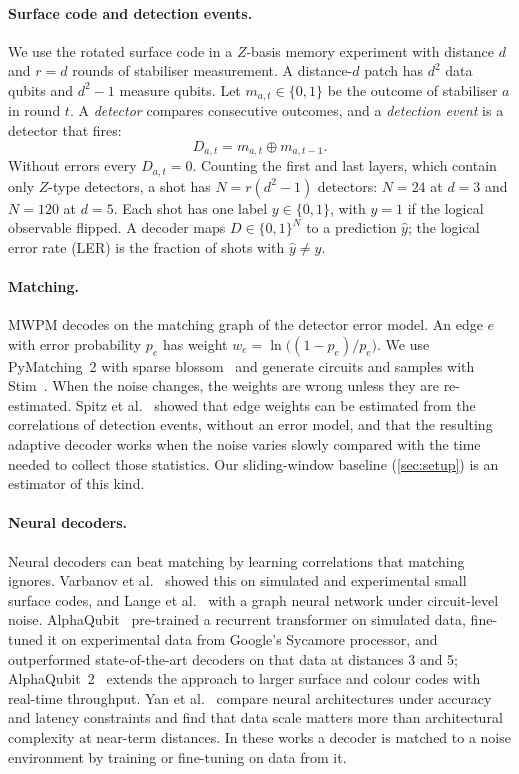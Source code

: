 \documentclass[11pt,a4paper]{article}
\begin{document}
\paragraph{Surface code and detection events.}
We use the rotated surface code in a $Z$-basis memory experiment with distance $d$ and $r=d$ rounds of
stabiliser measurement. A distance-$d$ patch has $d^2$ data qubits and $d^2-1$ measure qubits. Let
$m_{a,t}\in\{0,1\}$ be the outcome of stabiliser $a$ in round $t$. A \emph{detector} compares consecutive
outcomes, and a \emph{detection event} is a detector that fires:
\begin{equation}
  D_{a,t} = m_{a,t}\oplus m_{a,t-1}.
\end{equation}
Without errors every $D_{a,t}=0$. Counting the first and last layers, which contain only $Z$-type detectors, a
shot has $N=r(d^2-1)$ detectors: $N=24$ at $d=3$ and $N=120$ at $d=5$. Each shot has one label
$y\in\{0,1\}$, with $y=1$ if the logical observable flipped. A decoder maps $D\in\{0,1\}^N$ to a prediction
$\hat y$; the logical error rate (LER) is the fraction of shots with $\hat y\neq y$.

\paragraph{Matching.}
MWPM decodes on the matching graph of the detector error model. An edge $e$ with error probability $p_e$ has
weight $w_e=\ln\bigl((1-p_e)/p_e\bigr)$. We use PyMatching~2 with sparse blossom~\cite{higgott2025sparse} and
generate circuits and samples with Stim~\cite{gidney2021stim}. When the noise changes, the weights are wrong
unless they are re-estimated. Spitz et al.~\cite{spitz2018adaptive} showed that edge weights can be estimated
from the correlations of detection events, without an error model, and that the resulting adaptive decoder
works when the noise varies slowly compared with the time needed to collect those statistics. Our
sliding-window baseline (\cref{sec:setup}) is an estimator of this kind.

\paragraph{Neural decoders.}
Neural decoders can beat matching by learning correlations that matching ignores. Varbanov et
al.~\cite{varbanov2025nn} showed this on simulated and experimental small surface codes, and Lange et
al.~\cite{lange2025gnn} with a graph neural network under circuit-level noise. AlphaQubit~\cite{bausch2024alphaqubit}
pre-trained a recurrent transformer on simulated data, fine-tuned it on experimental data from Google's Sycamore
processor, and outperformed state-of-the-art decoders on that data at distances 3 and 5; AlphaQubit~2~\cite{senior2025alphaqubit2} extends the approach to larger surface and colour codes with
real-time throughput. Yan et al.~\cite{yan2026rethink} compare neural architectures under accuracy and latency
constraints and find that data scale matters more than architectural complexity at near-term distances. In these works
a decoder is matched to a noise environment by training or fine-tuning on data from it.
\end{document}
